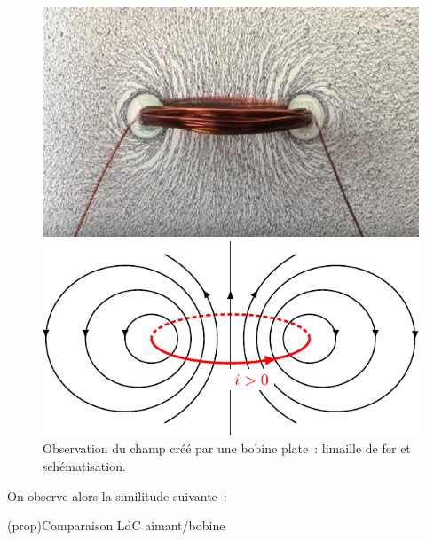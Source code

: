 \documentclass[../../main/main.tex]{subfiles}
\begin{document}
\begin{figure}[h]
	\noindent
	\begin{minipage}[c]{.48\linewidth}
	\includegraphics[width=\linewidth]{bplate_lim.jpg}
	\end{minipage}
  \hfill
	\begin{minipage}[c]{.48\linewidth}
	\includegraphics[width=\linewidth]{bplate_chp}
	\end{minipage}
	\caption{Observation du champ créé par une bobine plate~: limaille de fer et
		schématisation.}
	\label{fig:bplate}
\end{figure}
On observe alors la similitude suivante~:
\begin{tcb*}(prop){Comparaison LdC aimant/bobine}
	\begin{center}
	\end{center}
\end{tcb*}
\end{document}
